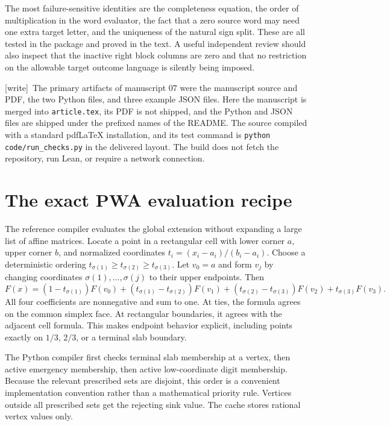 \documentclass[11pt,letterpaper]{article}
\numberwithin{equation}{section}
\theoremstyle{definition}
\theoremstyle{remark}
\newcommand{\code}[1]{\nolinkurl{#1}}
\newcommand{\wtag}{\textup{[write]}}
\begin{document}
The most failure-sensitive identities are the completeness equation, the order of multiplication in the word evaluator, the fact that a zero source word may need one extra target letter, and the uniqueness of the natural sign split. These are all tested in the package and proved in the text. A useful independent review should also inspect that the inactive right block columns are zero and that no restriction on the allowable target outcome language is silently being imposed.

\wtag\ The primary artifacts of manuscript 07 were the manuscript source and
PDF, the two Python files, and three example JSON files. Here the manuscript
is merged into \code{article.tex}, its PDF is not shipped, and the Python
and JSON files are shipped under the prefixed names of the README. The
source compiled with a standard pdf\LaTeX{} installation, and its test
command is \texttt{python code/run\_checks.py} in the delivered layout. The
build does not fetch the repository, run Lean, or require a network
connection.

\section{The exact PWA evaluation recipe}
\label{pqc:cb:app:evaluator}

The reference compiler evaluates the global extension without expanding a
large list of affine matrices.  Locate a point in a rectangular cell with
lower corner $a$, upper corner $b$, and normalized coordinates
$t_i=(x_i-a_i)/(b_i-a_i)$.  Choose a deterministic ordering
$t_{\sigma(1)}\ge t_{\sigma(2)}\ge t_{\sigma(3)}$.
Let $v_0=a$ and form $v_j$ by changing coordinates
$\sigma(1),\ldots,\sigma(j)$ to their upper endpoints.  Then
\begin{equation}
 F(x)=(1-t_{\sigma(1)})F(v_0)
 +(t_{\sigma(1)}-t_{\sigma(2)})F(v_1)
 +(t_{\sigma(2)}-t_{\sigma(3)})F(v_2)
 +t_{\sigma(3)}F(v_3).
 \label{pqc:cb:eq:barycentric}
\end{equation}
All four coefficients are nonnegative and sum to one.  At ties, the formula
agrees on the common simplex face.  At rectangular boundaries, it agrees with
the adjacent cell formula.  This makes endpoint behavior explicit, including
points exactly on $1/3$, $2/3$, or a terminal slab boundary.

The Python compiler first checks terminal slab membership at a vertex, then
active emergency membership, then active low-coordinate digit membership.
Because the relevant prescribed sets are disjoint, this order is a convenient
implementation convention rather than a mathematical priority rule.  Vertices
outside all prescribed sets get the rejecting sink value.  The cache stores
rational vertex values only.
\end{document}
